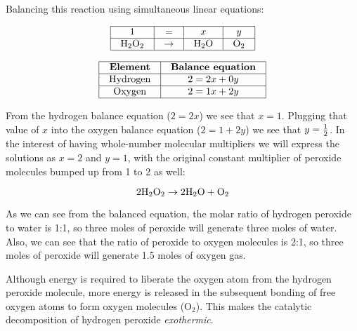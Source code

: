 
Balancing this reaction using simultaneous linear equations:


$$\vbox{\offinterlineskip
\halign{\strut
\vrule \quad\hfil # \ \hfil & 
\vrule \quad\hfil # \ \hfil & 
\vrule \quad\hfil # \ \hfil & 
\vrule \quad\hfil # \ \hfil \vrule \cr
\noalign{\hrule}
%
1 & = & $x$ & $y$ \cr
%
\noalign{\hrule}
%
H$_{2}$O$_{2}$ & $\to$ & H$_{2}$O & O$_{2}$ \cr
%
\noalign{\hrule}
} %
}$$ %


$$\vbox{\offinterlineskip
\halign{\strut
\vrule \quad\hfil # \ \hfil & 
\vrule \quad\hfil # \ \hfil \vrule \cr
\noalign{\hrule}
%
{\bf Element} & {\bf Balance equation} \cr
%
\noalign{\hrule}
%
Hydrogen & $2 = 2x + 0y$ \cr
%
\noalign{\hrule}
%
Oxygen & $2 = 1x + 2y$ \cr
%
\noalign{\hrule}
} %
}$$ %

From the hydrogen balance equation ($2 = 2x$) we see that $x = 1$.  Plugging that value of $x$ into the oxygen balance equation ($2 = 1 + 2y$) we see that $y = {1 \over 2}$.  In the interest of having whole-number molecular multipliers we will express the solutions as $x = 2$ and $y = 1$, with the original constant multiplier of peroxide molecules bumped up from 1 to 2 as well:

$$\hbox{2H}_2\hbox{O}_2 \to \hbox{2H}_2\hbox{O} + \hbox{O}_2$$

\vskip 10pt

As we can see from the balanced equation, the molar ratio of hydrogen peroxide to water is 1:1, so three moles of peroxide will generate three moles of water.  Also, we can see that the ratio of peroxide to oxygen molecules is 2:1, so three moles of peroxide will generate 1.5 moles of oxygen gas.

\vskip 10pt

Although energy is required to liberate the oxygen atom from the hydrogen peroxide molecule, more energy is released in the subsequent bonding of free oxygen atoms to form oxygen molecules (O$_{2}$).  This makes the catalytic decomposition of hydrogen peroxide {\it exothermic}.




